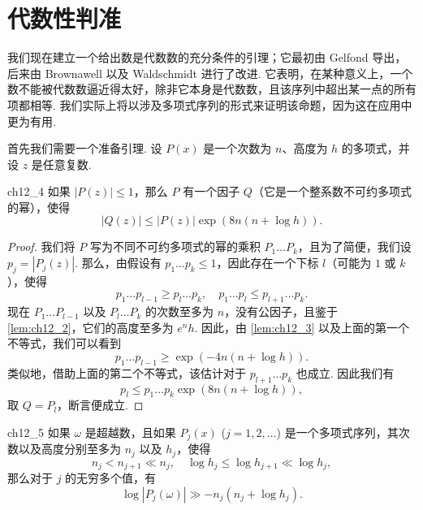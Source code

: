 \section{代数性判准}

我们现在建立一个给出数是代数数的充分条件的引理；它最初由 Gelfond 导出，后来由 Brownawell 以及 Waldschmidt 进行了改进. 它表明，在某种意义上，一个数不能被代数数逼近得太好，除非它本身是代数数，且该序列中超出某一点的所有项都相等. 我们实际上将以涉及多项式序列的形式来证明该命题，因为这在应用中更为有用.

首先我们需要一个准备引理. 设 $P(x)$ 是一个次数为 $n$、高度为 $h$ 的多项式，并设 $z$ 是任意复数.

\begin{mylemma}{}{ch12_4}
如果 $|P(z)| \le 1$，那么 $P$ 有一个因子 $Q$（它是一个整系数不可约多项式的幂），使得
\[|Q(z)| \leq |P(z)| \exp(8n(n + \log h)).\]
\end{mylemma}

\begin{proof}
我们将 $P$ 写为不同不可约多项式的幂的乘积 $P_1 \dots P_k$，且为了简便，我们设 $p_j = |P_j(z)|$. 那么，由假设有 $p_1 \dots p_k \le 1$，因此存在一个下标 $l$（可能为 $1$ 或 $k$），使得
\[p_1 \dots p_{l-1} \geqslant p_l \dots p_k, \quad p_1 \dots p_l \leqslant p_{l+1} \dots p_k.\]
现在 $P_1 \dots P_{l-1}$ 以及 $P_l \dots P_k$ 的次数至多为 $n$，没有公因子，且鉴于 \autoref{lem:ch12_2}，它们的高度至多为 $e^n h$. 因此，由 \autoref{lem:ch12_3} 以及上面的第一个不等式，我们可以看到
\[p_1 \dots p_{l-1} \geqslant \exp(-4n(n + \log h)).\]
类似地，借助上面的第二个不等式，该估计对于 $p_{l+1} \dots p_k$ 也成立. 因此我们有
\[p_l \leq p_1 \dots p_k \exp(8n(n + \log h)),\]
取 $Q = P_l$，断言便成立.
\end{proof}

\begin{mylemma}{}{ch12_5}
如果 $\omega$ 是超越数，且如果 $P_j(x)$ ($j = 1, 2, \ldots$) 是一个多项式序列，其次数以及高度分别至多为 $n_j$ 以及 $h_j$，使得
\[n_j < n_{j+1} \ll n_j, \quad \log h_j \leqslant \log h_{j+1} \ll \log h_j,\]
那么对于 $j$ 的无穷多个值，有
\[\log |P_j(\omega)| \gg -n_j(n_j + \log h_j).\]
\end{mylemma}

